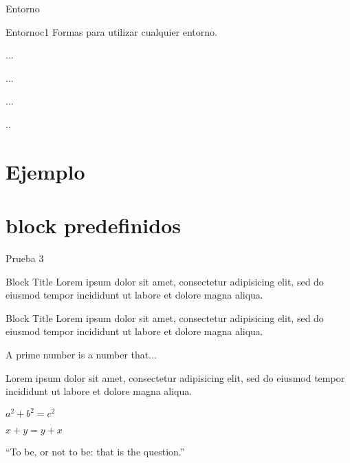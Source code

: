\documentclass[]{beamer}
\theoremstyle{plain}
\begin{document}
\begin{frame}[fragile]{Entorno}
\begin{source}{Entorno}{c1}
Formas para utilizar cualquier entorno.
\begin{entorno}
 ...
\end{entorno}

\begin{entorno}[(?Descripci\'{o}n?)]
 ...
\end{entorno}

\begin{entorno}[(? Descripci\'{o}n ?)][referencia]
 ...
\end{entorno}

\begin{entorno}[][referencia] %
 ..
\end{entorno}

\end{source}
\end{frame}
\section{Ejemplo}

\section{block predefinidos}
\begin{frame}[allowframebreaks]{Prueba 3}
\begin{block}{Block Title}
Lorem ipsum dolor sit amet, consectetur adipisicing elit, sed do eiusmod tempor incididunt ut labore et dolore magna aliqua.
\end{block}
\begin{alertblock}{Block Title}
Lorem ipsum dolor sit amet, consectetur adipisicing elit, sed do eiusmod tempor incididunt ut labore et dolore magna aliqua.
\end{alertblock}
\begin{definition}
A prime number is a number that...
\end{definition}
\begin{example}
Lorem ipsum dolor sit amet, consectetur adipisicing elit, sed do eiusmod tempor incididunt ut labore et dolore magna aliqua.
\end{example}
\begin{theorem}[Pythagoras]
$ a^2 + b^2 = c^2$
\end{theorem}
\begin{corollary}
$ x + y = y + x  $
\end{corollary}

\begin{exampleblock}{}
  {\large ``To be, or not to be: that is the question.''}
  \vskip5mm
  \hspace*{}
\end{exampleblock}

\end{frame}
\end{document}
